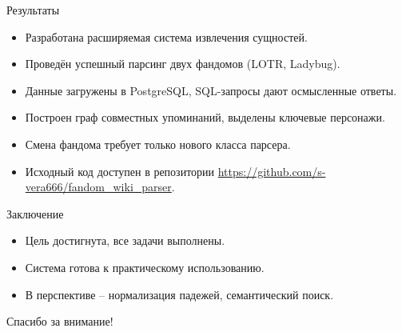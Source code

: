 \documentclass[russian, aspectratio=1610]{beamer}
\begin{document}
\begin{frame}{Результаты}
    \begin{itemize}
        \item Разработана расширяемая система извлечения сущностей.
        \item Проведён успешный парсинг двух фандомов (LOTR, Ladybug).
        \item Данные загружены в PostgreSQL, SQL-запросы дают осмысленные ответы.
        \item Построен граф совместных упоминаний, выделены ключевые персонажи.
        \item Смена фандома требует только нового класса парсера.
        \item Исходный код доступен в репозитории \url{https://github.com/s-vera666/fandom_wiki_parser}.
    \end{itemize}
\end{frame}

\begin{frame}{Заключение}
    \begin{itemize}
        \item Цель достигнута, все задачи выполнены.
        \item Система готова к практическому использованию.
        \item В перспективе – нормализация падежей, семантический поиск.
    \end{itemize}
    \vspace{2em}
    Спасибо за внимание!
\end{frame}
\end{document}
